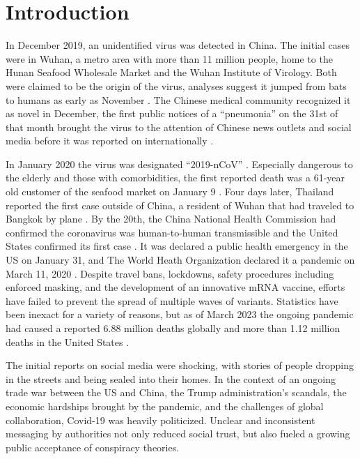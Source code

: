 \section{Introduction}

In December 2019, an unidentified virus was detected in China.
The initial cases were in Wuhan, a metro area with more than 11 million people, home to the Hunan Seafood Wholesale Market and the Wuhan Institute of Virology. Both were claimed to be the origin of the virus, analyses suggest it jumped from bats to humans as early as November \cite{parker2022}.
The Chinese medical community recognized it as novel in December, the first public notices of a ``pneumonia'' on the 31st of that month brought the virus to the attention of Chinese news outlets and social media before it was reported on internationally \cite{sahin2020}.

In January 2020 the virus was designated ``2019-nCoV'' \cite{world2020}.
Especially dangerous to the elderly and those with comorbidities, the first reported death was a 61-year old customer of the seafood market on January 9 \cite{burki2020}.
Four days later, Thailand reported the first case outside of China, a resident of Wuhan that had traveled to Bangkok by plane \cite{hsu2020}.
By the 20th, the China National Health Commission had confirmed the coronavirus was human-to-human transmissible and the United States confirmed its first case \cite{tang2020} \cite{stokes2020}.
It was declared a public health emergency in the US on January 31, and The World Heath Organization declared it a pandemic on March 11, 2020 \cite{patel2020} \cite{whaibeh2020}.
Despite travel bans, lockdowns, safety procedures including enforced masking, and the development of an innovative mRNA vaccine, efforts have failed to prevent the spread of multiple waves of variants.
Statistics have been inexact for a variety of reasons, but as of March 2023 the ongoing pandemic had caused a reported 6.88 million deaths globally and more than 1.12 million deaths in the United States \cite{dong2020}.

The initial reports on social media were shocking, with stories of people dropping in the streets and being sealed into their homes.
In the context of an ongoing trade war between the US and China, the Trump administration's scandals, the economic hardships brought by the pandemic, and the challenges of global collaboration, Covid-19 was heavily politicized.
Unclear and inconsistent messaging by authorities not only reduced social trust, but also fueled a growing public acceptance of conspiracy theories.

